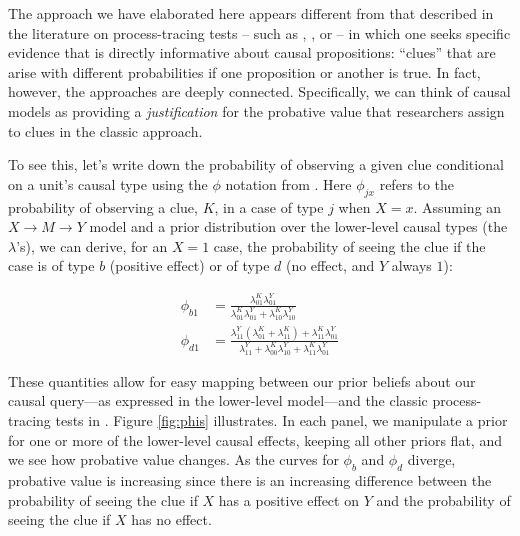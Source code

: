 \documentclass[
  12pt,
]{book}
\begin{document}
The approach we have elaborated here appears different from that described in the literature on process-tracing tests -- such as \citet{collier2011understanding}, \citet{BennettBayes}, or \citet{humphreys2015mixing} -- in which one seeks specific evidence that is directly informative about causal propositions: ``clues'' that are arise with different probabilities if one proposition or another is true. In fact, however, the approaches are deeply connected. Specifically, we can think of causal models as providing a \emph{justification} for the probative value that researchers assign to clues in the classic approach.

To see this, let's write down the probability of observing a given clue conditional on a unit's causal type using the \(\phi\) notation from \citet{humphreys2015mixing}. Here \(\phi_{jx}\) refers to the probability of observing a clue, \(K\), in a case of type \(j\) when \(X=x\). Assuming an \(X\rightarrow M \rightarrow Y\) model and a prior distribution over the lower-level causal types (the \(\lambda\)'s), we can derive, for an \(X=1\) case, the probability of seeing the clue if the case is of type \(b\) (positive effect) or of type \(d\) (no effect, and \(Y\) always \(1\)):

\begin{equation}
\begin{split}
\phi_{b1} & = \frac{\lambda_{01}^{K}\lambda_{01}^{Y}}{\lambda_{01}^{K}\lambda_{01}^{Y}+\lambda_{10}^{K}\lambda_{10}^{Y}}\\ 
\phi_{d1} & = \frac{\lambda_{11}^{Y}(\lambda_{01}^{K}+\lambda_{11}^{K})+\lambda_{11}^{K}\lambda_{01}^{Y}}{\lambda_{11}^{Y} + \lambda_{00}^{K}\lambda_{10}^{Y} + \lambda_{11}^{K}\lambda_{01}^{Y}}
\end{split}
\label{eqn:phisfromlambdas}
\end{equation}

These quantities allow for easy mapping between our prior beliefs about our causal query---as expressed in the lower-level model---and the classic process-tracing tests in \citet{Van-Evera:1997}. Figure \ref{fig:phis} illustrates. In each panel, we manipulate a prior for one or more of the lower-level causal effects, keeping all other priors flat, and we see how probative value changes. As the curves for \(\phi_b\) and \(\phi_d\) diverge, probative value is increasing since there is an increasing difference between the probability of seeing the clue if \(X\) has a positive effect on \(Y\) and the probability of seeing the clue if \(X\) has no effect.
\end{document}
